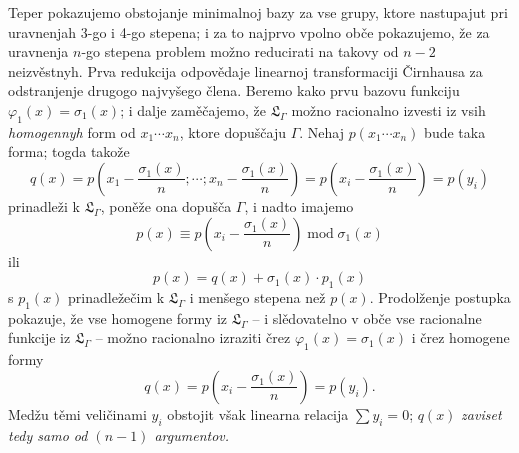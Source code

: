 \documentclass[11pt]{article}
\begin{document}
Teper pokazujemo obstojanje minimalnoj bazy za vse grupy, ktore nastupajut pri uravnenjah 3-go i 4-go stepena; i za to najprvo vpolno obče pokazujemo, že za uravnenja $n$-go stepena problem možno reducirati na takovy od $n-2$ neizvěstnyh. Prva redukcija odpovědaje linearnoj transformaciji Čirnhausa za odstranjenje drugogo najvyšego člena. Beremo kako prvu bazovu funkciju $\varphi_1(x)=\sigma_1(x)$; i dalje zaměčajemo, že $\mathfrak L_\Gamma$ možno racionalno izvesti iz vsih {\itshape homogennyh} form od $x_1\cdots x_n$, ktore dopuščaju $\Gamma$. Nehaj $p(x_1\cdots x_n)$ bude taka forma; togda takože
\[
q(x)=p\left(x_1-\frac{\sigma_1(x)}{n};\cdots;x_n-\frac{\sigma_1(x)}{n}\right)=p\left(x_i-\frac{\sigma_1(x)}{n}\right)=p(y_i)
\]
prinadleži k $\mathfrak L_\Gamma$, poněže ona dopušča $\Gamma$, i nadto imajemo
\[
p(x)\equiv p\left(x_i-\frac{\sigma_1(x)}{n}\right)\operatorname{mod}\sigma_1(x)
\]
ili
\[
p(x)=q(x)+\sigma_1(x)\cdot p_1(x)
\]
s $p_1(x)$ prinadležečim k $\mathfrak L_\Gamma$ i menšego stepena než $p(x)$. Prodolženje postupka pokazuje, že vse homogene formy iz $\mathfrak L_\Gamma$ -- i slědovatelno v obče vse racionalne funkcije iz $\mathfrak L_\Gamma$ -- možno racionalno izraziti črez $\varphi_1(x)=\sigma_1(x)$ i črez homogene formy
\[
q(x)=p\left(x_i-\frac{\sigma_1(x)}{n}\right)=p(y_i).
\]
Medžu těmi veličinami $y_i$ obstojit však linearna relacija $\sum y_i=0$; $q(x)$ {\itshape zaviset tedy samo od $(n-1)$ argumentov.}
\end{document}
